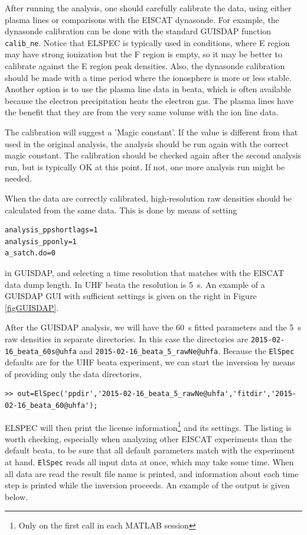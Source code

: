 \documentclass[12pt,a4paper]{report}
\begin{document}
After running the analysis, one should carefully calibrate the data, using either plasma lines or comparisons with the EISCAT dynasonde. For example, the dynasonde calibration can be done with the standard GUISDAP function \verb|calib_ne|. Notice that ELSPEC is typically used in conditions, where E region may have strong ionization but the F region is empty, so it may be better to calibrate against the E region peak densities. Also, the dynasonde calibration should be made with a time period where the ionosphere is more or less stable. Another option is to use the plasma line data in beata, which is often available because the electron precipitation heats the electron gas. The plasma lines have the benefit that they are from the very same volume with the ion line data. 

The calibration will suggest a 'Magic constant'. If the value is different from that used in the original analysis, the analysis should be run again with the correct magic constant. The calibration should be checked again after the second analysis run, but is typically OK at this point. If not, one more analysis run might be needed. 

When the data are correctly calibrated, high-resolution raw densities should be calculated from the same data. This is done by means of setting 
\begin{verbatim}
analysis_ppshortlags=1
analysis_pponly=1
a_satch.do=0
\end{verbatim}
in GUISDAP, and selecting a time resolution that matches with the EISCAT data dump length. In UHF beata the resolution is 5~s. An example of a GUISDAP GUI with sufficient settings is given on the right in Figure \ref{figGUISDAP}.

After the GUISDAP analysis, we will have the 60~s fitted parameters and the 5~s raw densities in separate directories. In this case the directories are \verb|2015-02-16_beata_60s@uhfa| and \verb|2015-02-16_beata_5_rawNe@uhfa|. Because the \verb|ElSpec| defaults are for the UHF beata experiment, we can start the inversion by means of providing only the data directories,


\begin{lstlisting}[style=myMATLAB]
>> out=ElSpec('ppdir','2015-02-16_beata_5_rawNe@uhfa','fitdir','2015-02-16_beata_60@uhfa');
\end{lstlisting}

ELSPEC will then print the license information\footnote{Only on the first call in each MATLAB session} and its settings. The listing is worth checking, especially when analyzing other EISCAT experiments than the default beata, to be sure that all default parameters match with the experiment at hand. \verb|ElSpec| reads all input data at once, which may take some time. When all data are read the result file name is printed, and information about each time step is printed while the inversion proceeds. An example of the output is given below. 
\end{document}
